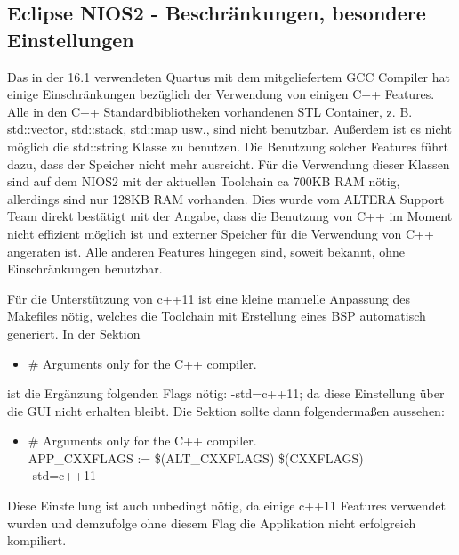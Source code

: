 \subsection{Eclipse NIOS2 - Beschränkungen, besondere Einstellungen}
Das in der 16.1 verwendeten Quartus mit dem mitgeliefertem GCC Compiler hat einige Einschränkungen bezüglich der Verwendung von einigen C++ Features. Alle in den C++ Standardbibliotheken vorhandenen STL Container, z. B. std::vector, std::stack, std::map usw., sind nicht benutzbar. Außerdem ist es nicht möglich die std::string Klasse zu benutzen. Die Benutzung solcher Features führt dazu, dass der Speicher nicht mehr ausreicht. Für die Verwendung dieser Klassen sind auf dem NIOS2 mit der aktuellen Toolchain ca 700KB RAM nötig, allerdings sind nur 128KB RAM vorhanden. Dies wurde vom ALTERA Support Team direkt bestätigt mit der Angabe, dass die Benutzung von C++ im Moment nicht effizient möglich ist und externer Speicher für die Verwendung von C++ angeraten ist. Alle anderen Features hingegen sind, soweit bekannt, ohne Einschränkungen benutzbar.

Für die Unterstützung von c++11 ist eine kleine manuelle Anpassung des Makefiles nötig, welches die Toolchain mit Erstellung eines BSP automatisch generiert. In der Sektion
\begin{itemize}
 \item \# Arguments only for the C++ compiler.
\end{itemize}
ist die Ergänzung folgenden Flags nötig: -std=c++11; da diese Einstellung über die GUI nicht erhalten bleibt. Die Sektion sollte dann folgendermaßen aussehen:
\begin{itemize}
 \item \# Arguments only for the C++ compiler.\\APP\_CXXFLAGS := \$(ALT\_CXXFLAGS) \$(CXXFLAGS) \ \\-std=c++11
\end{itemize}
Diese Einstellung ist auch unbedingt nötig, da einige c++11 Features verwendet wurden und demzufolge ohne diesem Flag die Applikation nicht erfolgreich kompiliert.

